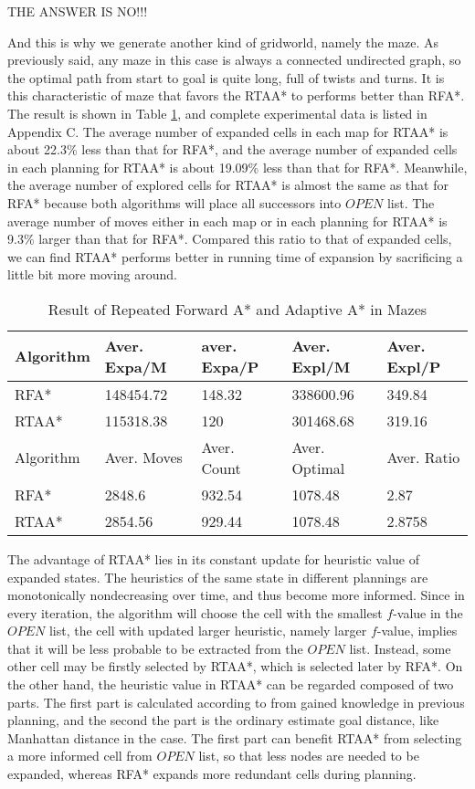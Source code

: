 THE ANSWER IS NO!!!

And this is why we generate another kind of gridworld, namely the maze. As
previously said, any maze in this case is always a connected undirected graph,
so the optimal path from start to goal is quite long, full of twists and turns.
It is this characteristic of maze that favors the RTAA* to performs better than
RFA*. The result is shown in Table \ref{tbl:rpa-rtaa2}, and complete
experimental data is listed in Appendix C. The average number of expanded cells
in each map for RTAA* is about 22.3\% less than that for RFA*, and the average
number of expanded cells in each planning for RTAA* is about 19.09\% less than
that for RFA*. Meanwhile, the average number of explored cells for RTAA* is
almost the same as that for RFA* because both algorithms will place all
successors into $OPEN$ list. The average number of moves either in each map or
in each planning for RTAA* is 9.3\% larger than that for RFA*. Compared this
ratio to that of expanded cells, we can find RTAA* performs better in running
time of expansion by sacrificing a little bit more moving around.

\begin{table}[ht]
\centering
\caption{Result of Repeated Forward A* and Adaptive A* in Mazes}
\begin{tabular}{|l|l|l|l|l|}
\hline
Algorithm & Aver. Expa/M & aver. Expa/P & Aver. Expl/M & Aver. Expl/P \\
\hline
RFA* & 148454.72 & 148.32 & 338600.96 & 349.84 \\
\hline
RTAA* & 115318.38 & 120 & 301468.68 & 319.16 \\
\hhline{|=|=|=|=|=|}
Algorithm & Aver. Moves & Aver. Count & Aver. Optimal & Aver. Ratio \\
\hline
RFA* & 2848.6 & 932.54 & 1078.48 & 2.87 \\
\hline
RTAA* & 2854.56 & 929.44 & 1078.48 & 2.8758 \\
\hline
\end{tabular}
\label{tbl:rpa-rtaa2}
\end{table}

The advantage of RTAA* lies in its constant update for heuristic value of
expanded states. The heuristics of the same state in different plannings are
monotonically nondecreasing over time, and thus become more
informed\cite{koenig2006real}. Since in every iteration, the algorithm will
choose the cell with the smallest $f$-value in the $OPEN$ list, the cell 
with updated larger heuristic, namely larger $f$-value, implies that it will be 
less probable to be extracted from the $OPEN$ list. Instead, some other cell may be 
firstly selected by RTAA*, which is selected later by RFA*. On the other hand,
the heuristic value in RTAA* can be regarded composed of two parts. The first 
part is calculated according to from gained knowledge in previous planning,
and the second the part is the ordinary estimate goal distance, like Manhattan
distance in the case. The first part can benefit RTAA* from selecting a more 
informed cell from $OPEN$ list, so that less nodes are needed to be expanded,
whereas RFA* expands more redundant cells during planning.

